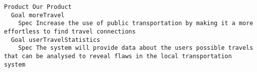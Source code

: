 \begin{lstlisting}
Product Our Product
  Goal moreTravel
    Spec Increase the use of public transportation by making it a more effortless to find travel connections
  Goal userTravelStatistics
    Spec The system will provide data about the users possible travels that can be analysed to reveal flaws in the local transportation system

\end{lstlisting}